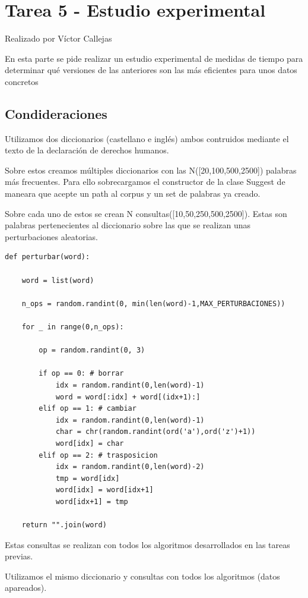 \section{Tarea 5 - Estudio experimental}

{\color{red}Realizado por Víctor Callejas} 

En esta parte se pide realizar un estudio experimental de medidas de tiempo para determinar qué
versiones de las anteriores son las más eficientes para unos datos concretos
\subsection{Condideraciones}
Utilizamos dos diccionarios (castellano e inglés) ambos contruidos mediante el texto de la declaración de derechos humanos.

Sobre estos creamos múltiples diccionarios con las N([20,100,500,2500]) palabras más frecuentes. Para ello sobrecargamos el constructor de la clase Suggest de maneara que acepte un path al corpus y un set de palabras ya creado.

Sobre cada uno de estos se crean N consultas([10,50,250,500,2500]). Estas son palabras pertenecientes al diccionario sobre las que se realizan unas perturbaciones aleatorias.

\begin{lstlisting}[caption=Función para crear perturbaciones aleatorias]
def perturbar(word):

    word = list(word)

    n_ops = random.randint(0, min(len(word)-1,MAX_PERTURBACIONES))

    for _ in range(0,n_ops):

        op = random.randint(0, 3)

        if op == 0: # borrar
            idx = random.randint(0,len(word)-1)
            word = word[:idx] + word[(idx+1):]
        elif op == 1: # cambiar
            idx = random.randint(0,len(word)-1)
            char = chr(random.randint(ord('a'),ord('z')+1))
            word[idx] = char
        elif op == 2: # trasposicion
            idx = random.randint(0,len(word)-2)
            tmp = word[idx]
            word[idx] = word[idx+1]
            word[idx+1] = tmp

    return "".join(word)
\end{lstlisting}

Estas consultas se realizan con todos los algoritmos desarrollados en las tareas previas.

Utilizamos el mismo diccionario y consultas con todos los algoritmos (datos apareados).

